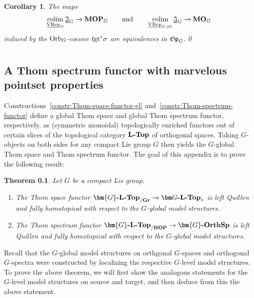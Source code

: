 \documentclass[reqno]{memo-l}
\theoremstyle{mythm}
\newtheorem{thm}{Theorem}[section]
\newtheorem{cor}[thm]{Corollary}
\renewcommand{\thechapter}{\Roman{chapter}}
\theoremstyle{definition}
\numberwithin{equation}{section}
\newcommand{\cat}[1]{\textbf{\textup{#1}}}
\newcommand{\colim}{\mathop{\textup{colim}}}
\newcommand{\fgt}{\textup{fgt}}
\newcommand{\Orb}{{\vphantom{\textup{t}}\smash{\textup{Orb}}}}
\newcommand{\ulhelper}[2]{\underline{\setbox0=\hbox{$#1#2$}\dp0=0.4pt \box0\relax}}
\newcommand{\ul}[1]{{\mathpalette\ulhelper{#1}}\hbox{\rule[-2pt]{0pt}{0pt}}}
\newcommand{\mySp}{{\mathfrak S\kern-.5pt\mathfrak p}}
\newcommand{\Gosp}[1]{\cat{$\bm{#1}$-OrthSp}}
\newcommand{\Gospc}[1]{\cat{$\bm{#1}$-$\cat{L}$-Top}}
\newcommand{\VRep}{\textup{VRep}}
\newcommand{\BOP}{\cat{BOP}}
\newcommand{\Gr}{\cat{Gr}}
\renewcommand{\thesection}{\thechapter.
\arabic{section}}
\begin{document}
\begin{cor}\label{cor:MOG-as-colim}
    The maps
    \[
        \colim_{\ul\VRep_G}\ul{\mathfrak J}_G\to\cat{MOP}_G\qquad\text{and}\qquad
        \colim_{\ul\VRep_{G,[0]}}\ul{\mathfrak J}_G\to\cat{MO}_G
    \]
    induced by the $\Orb_G$-cocone $\fgt^*\sigma$ are equivalences in $\mySp_G$.\qed
\end{cor}


\appendix
\setcounter{section}{0}

\renewcommand{\thesection}{\Alph{section}}
\chapter*{}
\section[A Thom spectrum functor with marvelous properties]{A Thom spectrum functor with marvelous pointset properties}
\label{app:thom-Stefan-functor}

Constructions~\ref{constr:Thom-space-functor-gl} and~\ref{constr:Thom-spectrum-functor} define a global Thom space and global Thom spectrum functor, respectively, as (symmetric monoidal) topologically enriched functors out of certain slices of the topological category $\cat{$\cat{L}$-Top}$ of orthogonal spaces. Taking $G$-objects on both sides for any compact Lie group $G$ then yields the $G$-global Thom space and Thom spectrum functor. The goal of this appendix is to prove the following result: 
  \begin{thm}\label{thm:Thom-marvelous-appendix} Let $G$ be a compact Lie group. 
\begin{enumerate}
\item The Thom space functor $\Gospc{G}_{/\Gr}\to \cat{$\bm G$-$\cat{L}$-Top}_*$ is left Quillen and fully homotopical with respect to the $G$-global model structures. 
\item The Thom spectrum functor $\Gospc{G}_{/\BOP}\to \Gosp{G}$ is left Quillen and fully homotopical with respect to the $G$-global model structures.
\end{enumerate}
  \end{thm}
Recall that the $G$-global model structures on orthgonal $G$-spaces and orthogonal $G$-spectra were constructed by localizing the respective $G$-level model structures. To prove the above theorem, we will first show the analogous statements for the $G$-level model structures on source and target, and then deduce from this the above statement. 
\end{document}
